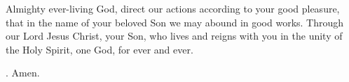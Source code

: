 \lettrine[lines=3]{A}{}lmighty ever-living God,
direct our actions according to your good pleasure,
that in the name of your beloved Son
we may abound in good works.
Through our Lord Jesus Christ, your Son,
who lives and reigns with you in the unity of the Holy Spirit,
one God, for ever and ever. \par \Rbar. Amen.
